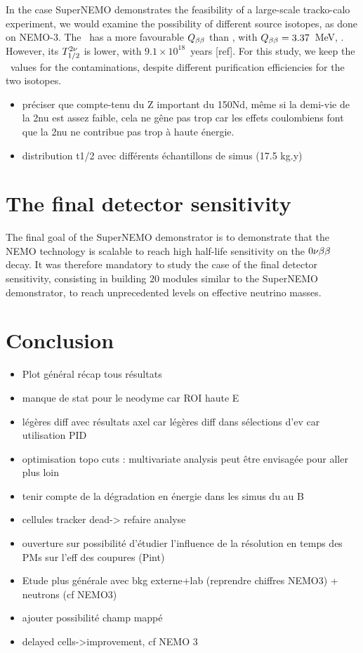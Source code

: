 In the case SuperNEMO demonstrates the feasibility of a large-scale tracko-calo experiment, we would examine the possibility of different source isotopes, as done on NEMO-$3$.
The \Nd\ has a more favourable $Q_{\beta\beta}$ than \Se, with $Q_{\beta\beta} = 3.37$~MeV, .
However, its $T_{1/2}^{2\nu}$ is lower, with $9.1\times 10^{18}$~years [ref].
For this study, we keep the \Se\ values for the contaminations, despite different purification efficiencies for the two isotopes.


\begin{itemize}
\item préciser que compte-tenu du Z important du 150Nd, même si la demi-vie de la 2nu est assez faible, cela ne gêne pas trop car les effets coulombiens font que la 2nu ne contribue pas trop à haute énergie.
\item distribution t1/2 avec différents échantillons de simus (17.5 kg.y)
\end{itemize}

\section{The final detector sensitivity}

The final goal of the SuperNEMO demonstrator is to demonstrate that the NEMO technology is scalable to reach high half-life sensitivity on the $0\nu\beta\beta$ decay.
It was therefore mandatory to study the case of the final detector sensitivity, consisting in building $20$ modules similar to the SuperNEMO demonstrator, to reach unprecedented levels on effective neutrino masses.



\section{Conclusion}
\begin{itemize}
\item Plot général récap tous résultats

\item manque de stat pour le neodyme car ROI haute E
\item légères diff avec résultats axel car légères diff dans sélections d'ev car utilisation PID

\item optimisation topo cuts : multivariate analysis peut être envisagée pour aller plus loin
\item tenir compte de la dégradation en énergie dans les simus du au B
\item cellules tracker dead-> refaire analyse
\item ouverture sur possibilité d'étudier l'influence de la résolution en temps des PMs sur l'eff des coupures (Pint)
\item Etude plus générale avec bkg externe+lab (reprendre chiffres NEMO3) + neutrons (cf NEMO3)
\item ajouter possibilité champ mappé
\item delayed cells->improvement, cf NEMO 3
\end{itemize}
